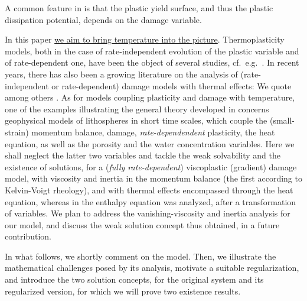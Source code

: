 \documentclass[a4paper,10pt,reqno]{amsart}
\numberwithin{equation}{section}
\numberwithin{equation}{section}
\newcommand{\EEE}{\color{black}}
\newcommand{\MMM}{\color{black}}%
\begin{document}
   A common feature in  \cite{Roub-Souc-Vodicka2013,Roub-Valdman2016,Crismale,Crismale-Lazzaroni} is that the plastic yield surface, and thus the plastic dissipation potential, depends on the damage variable. 
   \par
  In this paper  \underline{we aim to bring temperature into the picture}. Thermoplasticity models, both in the case of rate-independent evolution of the plastic variable and of rate-dependent one, have been the object of several studies, cf.\ e.g.\ \cite{KS97,KSS02,KSS03,Roub-Bartels-1,Roub-Bartels-2,Roub-PP,HMS,Rossi2016}. In recent years, there has also been a growing literature on the analysis of (rate-independent or rate-dependent) damage models with thermal effects: We quote among others \cite{Bonetti-Bonfanti,Roub10TRIP,Rocca-Rossi2014,Heinemann-Rocca,Rocca-Rossi,LRTT}. 
  \MMM As for models  coupling  plasticity and damage with temperature, 
  one of the examples illustrating the general theory developed in  \cite{Roub-Tomassetti} concerns geophysical models of lithospheres in short time scales, which couple the  (small-strain) momentum balance, damage, \emph{rate-dependendent} plasticity, the heat equation,  as well as the porosity and the water concentration variables. Here we shall neglect the  latter two variables and 
  \EEE
tackle the weak solvability and the existence of solutions,
     for a  (\emph{fully rate-dependent}) viscoplastic  (gradient) damage model,  with viscosity and inertia in the momentum balance (the first  according to Kelvin-Voigt rheology), and with thermal effects  encompassed through the heat equation, \MMM whereas in \cite{Roub-Tomassetti} 
     the enthalpy equation  was analyzed, after a transformation of variables. \EEE
    We plan to address the  vanishing-viscosity and inertia analysis for our model, and discuss the weak solution concept thus obtained, in a future contribution.
    \par
    In what follows, we  shortly comment on the model. %
     Then, we illustrate the mathematical challenges posed by its analysis,
    motivate a suitable regularization, and
    introduce the two solution concepts, for the original system and its regularized version, for which we will prove two existence results.
\end{document}
